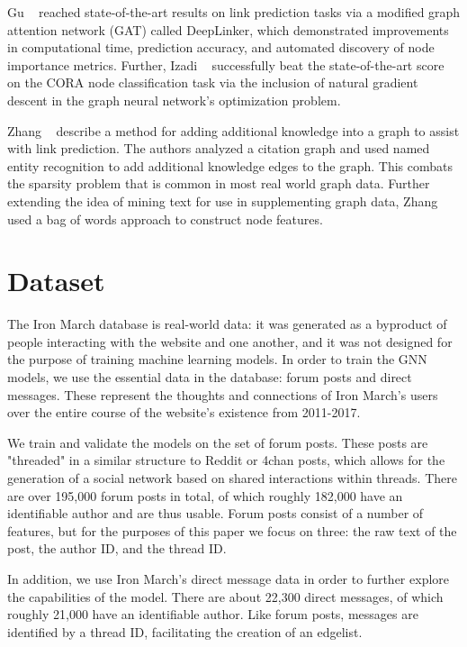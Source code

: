 \documentclass[10pt,twocolumn,letterpaper]{article}
\begin{document}
Gu \etal~\cite{graphattention} reached state-of-the-art results on link prediction tasks via a modified graph attention network (GAT) called DeepLinker, which demonstrated improvements in computational time, prediction accuracy, and automated discovery of node importance metrics. Further, Izadi \etal~\cite{izadi} successfully beat the state-of-the-art score on the CORA node classification task via the inclusion of natural gradient descent in the graph neural network's optimization problem.

Zhang \etal~\cite{zhang} describe a method for adding additional knowledge into a graph to assist with link prediction. The authors analyzed a citation graph and used named entity recognition to add additional knowledge edges to the graph. This combats the sparsity problem that is common in most real world graph data. Further extending the idea of mining text for use in supplementing graph data, Zhang \etal~\cite{zhang} used a bag of words approach to construct node features.

\section{Dataset}

The Iron March database is real-world data: it was generated as a byproduct of people interacting with the website and one another, and it was not designed for the purpose of training machine learning models. In order to train the GNN models, we use the essential data in the database: forum posts and direct messages. These represent the thoughts and connections of Iron March's users over the entire course of the website's existence from 2011-2017. 

We train and validate the models on the set of forum posts. These posts are "threaded" in a similar structure to Reddit or 4chan posts, which allows for the generation of a social network based on shared interactions within threads. There are over 195,000 forum posts in total, of which roughly 182,000 have an identifiable author and are thus usable. Forum posts consist of a number of features, but for the purposes of this paper we focus on three: the raw text of the post, the author ID, and the thread ID. 

In addition, we use Iron March's direct message data in order to further explore the capabilities of the model. There are about 22,300 direct messages, of which roughly 21,000 have an identifiable author. Like forum posts, messages are identified by a thread ID, facilitating the creation of an edgelist.
\end{document}
